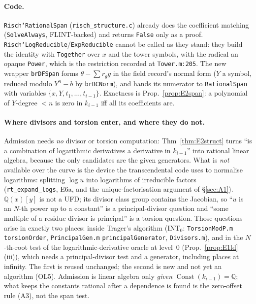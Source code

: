 \documentclass[11pt]{article}
\theoremstyle{definition}
\theoremstyle{remark}
\newcommand{\Q}{\mathbb{Q}}
\newcommand{\code}[1]{\texttt{#1}}
\begin{document}
\paragraph{Code.} \code{Risch`RationalSpan} (\code{risch\_structure.c}) already does the
coefficient matching (\code{SolveAlways}, FLINT-backed) and returns \code{False} only as a
proof. \code{Risch`LogReducible}/\code{ExpReducible} cannot be called as they stand: they
build the identity with \code{Together} over $x$ and the tower symbols, with the radical
an opaque \code{Power}, which is the restriction recorded at \code{Tower.m:205}. The new
wrapper \code{brDFSpan} forms $\theta-\sum r_gg$ in the field record's normal form
($Y$ a symbol, reduced modulo $Y^n-b$ by \code{brBCNorm}), and hands its numerator to
\code{RationalSpan} with variables $\{x,Y,t_1,\dots,t_{i-1}\}$. Exactness is
Prop.~\ref{prop:E2span}: a polynomial of $Y$-degree $<n$ is zero in $k_{i-1}$ iff all its
coefficients are.

\paragraph{Where divisors and torsion enter, and where they do not.} Admission needs
\emph{no} divisor or torsion computation: Thm~\ref{thm:E2struct} turns ``is a combination
of logarithmic derivatives a derivative in $k_{i-1}$'' into rational linear algebra,
because the only candidates are the given generators. What is \emph{not} available over the
curve is the device the transcendental code uses to normalise logarithms: splitting
$\log u$ into logarithms of irreducible factors (\code{rt\_expand\_logs}, E6a, and the
unique-factorisation argument of \S\ref{sec:A1}). $\Q(x)[y]$ is not a UFD; its divisor
class group contains the Jacobian, so ``$u$ is an $N$-th power up to a constant'' is a
principal-divisor question and ``some multiple of a residue divisor is principal'' is a
torsion question. Those questions arise in exactly two places: inside Trager's algorithm
(INT$_0$: \code{TorsionModP.m} \code{torsionOrder}, \code{PrincipalGen.m}
\code{principalGenerator}, \code{Divisors.m}), and in the $N$-th-root test of the
logarithmic-derivative oracle at level~0 (Prop.~\ref{prop:E1ld}(iii)), which needs a
principal-divisor test and a generator, including places at infinity. The first is reused
unchanged; the second is new and not yet an algorithm (OL5). Admission is linear algebra only
\emph{given} $\operatorname{Const}(k_{i-1})=\Q$; what keeps the constants rational after a
dependence is found is the zero-offset rule (A3), not the span test.
\end{document}
